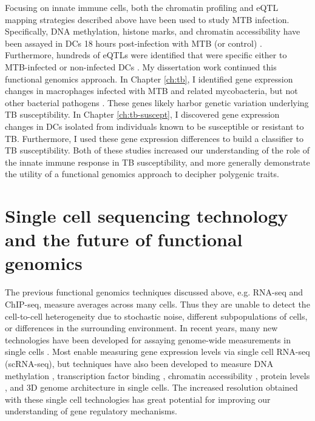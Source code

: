 Focusing on innate immune cells, both the chromatin profiling and eQTL
mapping strategies described above have been used to study MTB
infection. Specifically, DNA methylation, histone marks, and chromatin
accessibility have been assayed in DCs 18 hours post-infection with
MTB (or control) \citep{Pacis2015}. Furthermore, hundreds of eQTLs
were identified that were specific either to MTB-infected or
non-infected DCs \citep{Barreiro2012}. My dissertation work continued
this functional genomics approach. In Chapter \ref{ch:tb}, I
identified gene expression changes in macrophages infected with MTB
and related mycobacteria, but not other bacterial pathogens \citep{Blischak2015}. These
genes likely harbor genetic variation underlying TB susceptibility. In
Chapter \ref{ch:tb-suscept}, I discovered gene expression changes in
DCs isolated from individuals known to be susceptible or resistant to
TB. Furthermore, I used these gene expression differences to build a
classifier to TB susceptibility. Both of these studies increased our
understanding of the role of the innate immune response in TB
susceptibility, and more generally demonstrate the utility of a
functional genomics approach to decipher polygenic traits.


\section{Single cell sequencing technology and the future of functional genomics}

The previous functional genomics techniques discussed above,
e.g. RNA-seq and ChIP-seq, measure averages across many cells. Thus
they are unable to detect the cell-to-cell heterogeneity due to
stochastic noise, different subpopulations of cells, or differences in
the surrounding environment. In recent years, many new technologies
have been developed for assaying genome-wide measurements in single
cells \citep{Liang2014, Macaulay2014, Saliba2014, Grun2015, Stegle2015, Bacher2016}.
Most enable measuring gene expression levels via single cell
RNA-seq (scRNA-seq), but techniques have also been developed to
measure DNA methylation \citep{Smallwood2014, Angermueller2016},
transcription factor binding \citep{Rotem2015},
chromatin accessibility \citep{Buenrostro2015, Cusanovich2015},
protein levels \citep{Genshaft2016}, and 3D genome architecture \citep{Nagano2013}
in single cells. The increased resolution
obtained with these single cell technologies has great potential for
improving our understanding of gene regulatory mechanisms.

